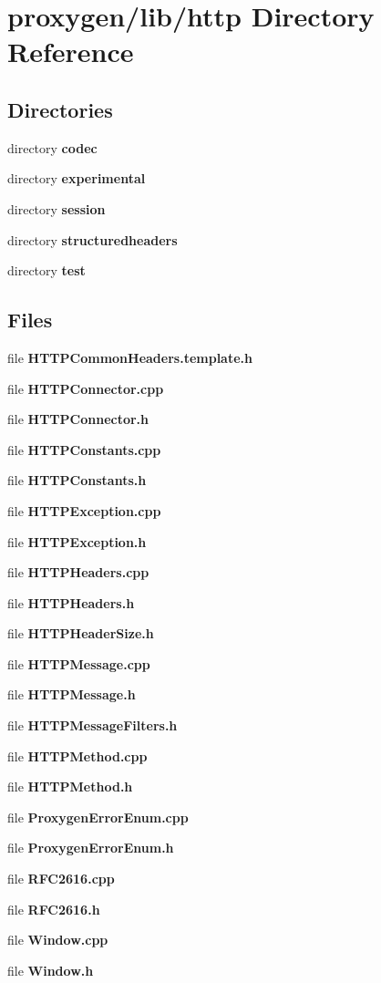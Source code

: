 \section{proxygen/lib/http Directory Reference}
\label{dir_bf1b8217360450c8f2328843af490dd2}
\subsection*{Directories}
\begin{DoxyCompactItemize}
\item 
directory {\bf codec}
\item 
directory {\bf experimental}
\item 
directory {\bf session}
\item 
directory {\bf structuredheaders}
\item 
directory {\bf test}
\end{DoxyCompactItemize}
\subsection*{Files}
\begin{DoxyCompactItemize}
\item 
file {\bf H\+T\+T\+P\+Common\+Headers.\+template.\+h}
\item 
file {\bf H\+T\+T\+P\+Connector.\+cpp}
\item 
file {\bf H\+T\+T\+P\+Connector.\+h}
\item 
file {\bf H\+T\+T\+P\+Constants.\+cpp}
\item 
file {\bf H\+T\+T\+P\+Constants.\+h}
\item 
file {\bf H\+T\+T\+P\+Exception.\+cpp}
\item 
file {\bf H\+T\+T\+P\+Exception.\+h}
\item 
file {\bf H\+T\+T\+P\+Headers.\+cpp}
\item 
file {\bf H\+T\+T\+P\+Headers.\+h}
\item 
file {\bf H\+T\+T\+P\+Header\+Size.\+h}
\item 
file {\bf H\+T\+T\+P\+Message.\+cpp}
\item 
file {\bf H\+T\+T\+P\+Message.\+h}
\item 
file {\bf H\+T\+T\+P\+Message\+Filters.\+h}
\item 
file {\bf H\+T\+T\+P\+Method.\+cpp}
\item 
file {\bf H\+T\+T\+P\+Method.\+h}
\item 
file {\bf Proxygen\+Error\+Enum.\+cpp}
\item 
file {\bf Proxygen\+Error\+Enum.\+h}
\item 
file {\bf R\+F\+C2616.\+cpp}
\item 
file {\bf R\+F\+C2616.\+h}
\item 
file {\bf Window.\+cpp}
\item 
file {\bf Window.\+h}
\end{DoxyCompactItemize}
